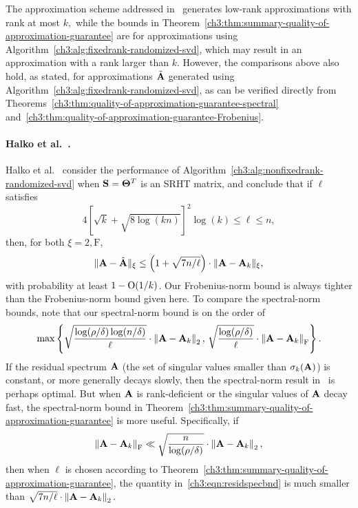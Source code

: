 The approximation scheme addressed in~\cite{NDT09} generates low-rank
approximations with rank at most $k,$ while the bounds in Theorem~\ref{ch3:thm:summary-quality-of-approximation-guarantee}
are for approximations using Algorithm~\ref{ch3:alg:fixedrank-randomized-svd},
which may result in an approximation with a rank larger than $k.$
However, the comparisons above also hold, as stated, for approximations $\tilde{\mathbf{A}}$ 
generated using Algorithm~\ref{ch3:alg:fixedrank-randomized-svd}, as
can be verified directly from Theorems~\ref{ch3:thm:quality-of-approximation-guarantee-spectral}
and~\ref{ch3:thm:quality-of-approximation-guarantee-Frobenius}.

\paragraph{Halko et al.~\cite{HMT11}.}
Halko et al.~\cite{HMT11} consider the performance of Algorithm~\ref{ch3:alg:nonfixedrank-randomized-svd}
when $\mathbf{S} = \mathbf{\Theta}^T$ is an SRHT matrix, and conclude that if $\ell$ satisfies
\begin{equation}\label{ch3:eqn:rhmt}
4 \left[\sqrt{k} + \sqrt{8\log(kn)} \right]^2 \log(k) \leq \ell \leq n,
\end{equation}
then, for both $\xi=2,\mathrm{F}$,
$$ \mbox{}\|\mathbf{A} - \tilde{\mathbf{A}}\|_{\xi} 
 \le \left( 1 + \sqrt{7n/\ell} \right) \cdot \mbox{}\|\mathbf{A} - \mathbf{A}_k\|_{\xi},$$
with probability at least $1 - \mathrm{O}(1/k)$. Our Frobenius-norm bound is 
always tighter than the Frobenius-norm bound given here.
To compare the spectral-norm bounds, note that our spectral-norm bound is on 
the order of
\begin{equation}
\label{ch3:eqn:residspecbnd}
 \max\left\{\sqrt{\frac{ \log(\rho/\delta) \log(n/\delta)}{\ell} } \cdot 
 \left\|\mathbf{A} - \mathbf{A}_k\right\|_2,\,  \sqrt{ \frac{ \log(\rho/\delta) }{ \ell } } \cdot \left\|\mathbf{A} - \mathbf{A}_k\right\|_\mathrm{F}\right\}.
\end{equation}
If the residual spectrum $\mathbf{A}$ (the set of singular values smaller than $\sigma_k(\mathbf{A})$)
is constant, or more generally decays slowly, then the spectral-norm result 
in~\cite{HMT11} is perhaps optimal. But when $\mathbf{A}$ is rank-deficient or the 
singular values of $\mathbf{A}$ decay fast, the spectral-norm bound in 
Theorem~\ref{ch3:thm:summary-quality-of-approximation-guarantee} is more useful. Specifically, if
$$ \left\|\mathbf{A} - \mathbf{A}_k\right\|_\mathrm{F} \ll \sqrt{ \frac{n}{ \log(\rho/\delta) } } \cdot \left\|\mathbf{A} - \mathbf{A}_k\right\|_2,$$
then when $\ell$ is chosen according to Theorem~\ref{ch3:thm:summary-quality-of-approximation-guarantee},
the quantity in~\eqref{ch3:eqn:residspecbnd} is much smaller than $\sqrt{7 n/\ell} \cdot \left\|\mathbf{A} - \mathbf{A}_k\right\|_2.$


